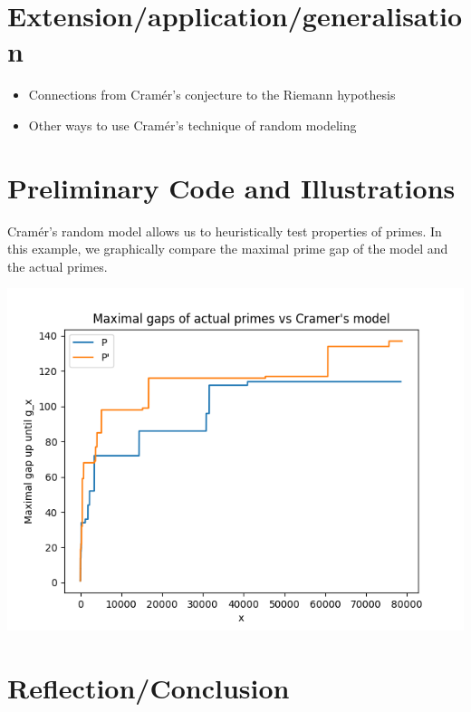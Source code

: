 \documentclass[12pt, letterpaper]{article}
\begin{document}
\section{Extension/application/generalisation}
\begin{itemize}
    \item Connections from Cram\'er's conjecture to the Riemann hypothesis
    \item Other ways to use Cram\'er's technique of random modeling
\end{itemize}


\section{Preliminary Code and Illustrations}

Cram\'er's random model allows us to heuristically test properties of primes.
In this example, we graphically compare the maximal prime gap of the model and the actual primes.

\includegraphics[scale=0.7]{graph.png}

\section{Reflection/Conclusion}
\end{document}
